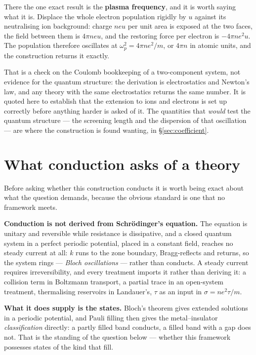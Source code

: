 \documentclass[11pt]{article}
\begin{document}
There the one exact result is the \textbf{plasma frequency}, and it is worth saying what it is.
Displace the whole electron population rigidly by $u$ against its neutralising ion background: charge
$neu$ per unit area is exposed at the two faces, the field between them is $4\pi neu$, and the
restoring force per electron is $-4\pi ne^2u$. The population therefore oscillates at
$\omega_p^2=4\pi ne^2/m$, or $4\pi n$ in atomic units, and the construction returns it exactly.

That is a check on the Coulomb bookkeeping of a two-component system, not evidence for the quantum
structure: the derivation is electrostatics and Newton's law, and any theory with the same
electrostatics returns the same number. It is quoted here to establish that the extension to ions
and electrons is set up correctly before anything harder is asked of it. The quantities that
\emph{would} test the quantum structure --- the screening length and the dispersion of that
oscillation --- are where the construction is found wanting, in \S\ref{sec:coefficient}.

\section{What conduction asks of a theory}\label{sec:bar}

Before asking whether this construction conducts it is worth being exact about what the question
demands, because the obvious standard is one that no framework meets.

\textbf{Conduction is not derived from Schr\"odinger's equation.} The equation is unitary and
reversible while resistance is dissipative, and a closed quantum system in a perfect periodic
potential, placed in a constant field, reaches no steady current at all: $k$ runs to the zone
boundary, Bragg-reflects and returns, so the system rings --- \emph{Bloch oscillations} --- rather
than conducts. A steady current requires irreversibility, and every treatment imports it rather than
deriving it: a collision term in Boltzmann transport, a partial trace in an open-system treatment,
thermalising reservoirs in Landauer's, $\tau$ as an input in $\sigma=ne^2\tau/m$.

\textbf{What it does supply is the states.} Bloch's theorem gives extended solutions in a periodic
potential, and Pauli filling then gives the metal--insulator \emph{classification} directly: a
partly filled band conducts, a filled band with a gap does not. That is the standing of the question
below --- whether this framework possesses states of the kind that fill.
\end{document}

